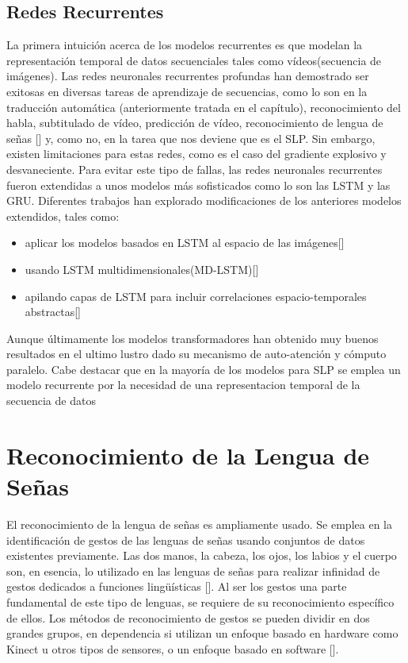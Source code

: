 \subsection{Redes Recurrentes}\label{subsection:state-of-the-art:slp:LSTM}
La primera intuición acerca de los modelos recurrentes es que modelan la representación temporal de datos secuenciales tales como vídeos(secuencia de imágenes). Las redes neuronales recurrentes profundas han demostrado ser exitosas en diversas tareas de aprendizaje de secuencias, como lo son en la traducción automática (anteriormente tratada en el capítulo), reconocimiento del habla, subtitulado de vídeo, predicción de vídeo, reconocimiento de lengua de señas [\cite{leynier-lsc-2021}] y, como no, en la tarea que nos deviene que es el SLP. Sin embargo, existen limitaciones para estas redes, como es el caso del gradiente explosivo y desvaneciente. Para evitar este tipo de fallas, las redes neuronales recurrentes fueron extendidas a unos modelos más sofisticados como lo son las LSTM y las GRU. Diferentes trabajos han explorado modificaciones de los anteriores modelos extendidos, tales como:
\begin{itemize}

\item aplicar los modelos basados en LSTM al espacio de las imágenes[\cite{Shi2015ConvolutionalLN}]
\item usando LSTM multidimensionales(MD-LSTM)[\cite{Graves2007MultidimensionalRN}]
\item  apilando capas de LSTM para incluir correlaciones espacio-temporales abstractas[\cite{Finn2016UnsupervisedLF}]
\end{itemize} 

Aunque últimamente los modelos transformadores han obtenido muy buenos resultados en el ultimo lustro dado su mecanismo de auto-atención y cómputo paralelo. Cabe destacar que en la mayoría de los modelos para SLP se emplea un modelo recurrente por la necesidad de una representacion temporal de la secuencia de datos



\section{Reconocimiento de la Lengua de Señas}\label{section:state-of-the-art:slr}
El reconocimiento de la lengua de señas es ampliamente usado. Se emplea en la identificación de gestos de las lenguas de señas usando conjuntos de datos existentes
previamente. Las dos manos, la cabeza, los ojos, los
labios y el cuerpo  son, en esencia, lo utilizado en las lenguas de señas para realizar infinidad de gestos dedicados a funciones lingüísticas [\cite{sandler2012dedicated}]. Al ser los gestos una parte fundamental de este tipo de lenguas, se requiere de su reconocimiento específico de ellos. Los métodos de reconocimiento de gestos se pueden dividir en dos grandes grupos, en dependencia si utilizan un enfoque basado en hardware como Kinect u otros tipos de sensores, o un enfoque basado en software [\cite{mitra2007gesture}].

